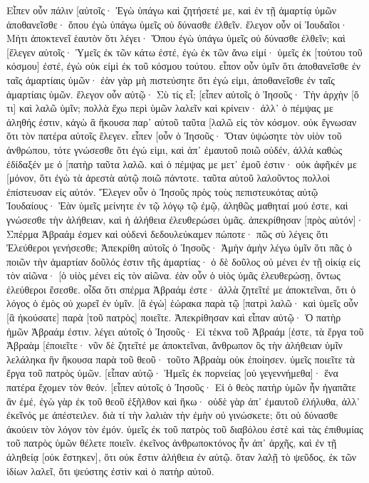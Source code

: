 Εἶπεν οὖν πάλιν [αὐτοῖς· Ἐγὼ ὑπάγω καὶ ζητήσετέ με, καὶ ἐν τῇ ἁμαρτίᾳ ὑμῶν ἀποθανεῖσθε· ὅπου ἐγὼ ὑπάγω ὑμεῖς οὐ δύνασθε ἐλθεῖν. 
ἔλεγον οὖν οἱ Ἰουδαῖοι· Μήτι ἀποκτενεῖ ἑαυτὸν ὅτι λέγει· Ὅπου ἐγὼ ὑπάγω ὑμεῖς οὐ δύνασθε ἐλθεῖν; 
καὶ [ἔλεγεν αὐτοῖς· Ὑμεῖς ἐκ τῶν κάτω ἐστέ, ἐγὼ ἐκ τῶν ἄνω εἰμί· ὑμεῖς ἐκ [τούτου τοῦ κόσμου] ἐστέ, ἐγὼ οὐκ εἰμὶ ἐκ τοῦ κόσμου τούτου. 
εἶπον οὖν ὑμῖν ὅτι ἀποθανεῖσθε ἐν ταῖς ἁμαρτίαις ὑμῶν· ἐὰν γὰρ μὴ πιστεύσητε ὅτι ἐγώ εἰμι, ἀποθανεῖσθε ἐν ταῖς ἁμαρτίαις ὑμῶν. 
ἔλεγον οὖν αὐτῷ· Σὺ τίς εἶ; [εἶπεν αὐτοῖς ὁ Ἰησοῦς· Τὴν ἀρχὴν [ὅ τι] καὶ λαλῶ ὑμῖν; 
πολλὰ ἔχω περὶ ὑμῶν λαλεῖν καὶ κρίνειν· ἀλλ᾽ ὁ πέμψας με ἀληθής ἐστιν, κἀγὼ ἃ ἤκουσα παρ᾽ αὐτοῦ ταῦτα [λαλῶ εἰς τὸν κόσμον. 
οὐκ ἔγνωσαν ὅτι τὸν πατέρα αὐτοῖς ἔλεγεν. 
εἶπεν [οὖν ὁ Ἰησοῦς· Ὅταν ὑψώσητε τὸν υἱὸν τοῦ ἀνθρώπου, τότε γνώσεσθε ὅτι ἐγώ εἰμι, καὶ ἀπ᾽ ἐμαυτοῦ ποιῶ οὐδέν, ἀλλὰ καθὼς ἐδίδαξέν με ὁ [πατὴρ ταῦτα λαλῶ. 
καὶ ὁ πέμψας με μετ᾽ ἐμοῦ ἐστιν· οὐκ ἀφῆκέν με [μόνον, ὅτι ἐγὼ τὰ ἀρεστὰ αὐτῷ ποιῶ πάντοτε. 
ταῦτα αὐτοῦ λαλοῦντος πολλοὶ ἐπίστευσαν εἰς αὐτόν. 
Ἔλεγεν οὖν ὁ Ἰησοῦς πρὸς τοὺς πεπιστευκότας αὐτῷ Ἰουδαίους· Ἐὰν ὑμεῖς μείνητε ἐν τῷ λόγῳ τῷ ἐμῷ, ἀληθῶς μαθηταί μού ἐστε, 
καὶ γνώσεσθε τὴν ἀλήθειαν, καὶ ἡ ἀλήθεια ἐλευθερώσει ὑμᾶς. 
ἀπεκρίθησαν [πρὸς αὐτόν]· Σπέρμα Ἀβραάμ ἐσμεν καὶ οὐδενὶ δεδουλεύκαμεν πώποτε· πῶς σὺ λέγεις ὅτι Ἐλεύθεροι γενήσεσθε; 
Ἀπεκρίθη αὐτοῖς ὁ Ἰησοῦς· Ἀμὴν ἀμὴν λέγω ὑμῖν ὅτι πᾶς ὁ ποιῶν τὴν ἁμαρτίαν δοῦλός ἐστιν τῆς ἁμαρτίας· 
ὁ δὲ δοῦλος οὐ μένει ἐν τῇ οἰκίᾳ εἰς τὸν αἰῶνα· [ὁ υἱὸς μένει εἰς τὸν αἰῶνα. 
ἐὰν οὖν ὁ υἱὸς ὑμᾶς ἐλευθερώσῃ, ὄντως ἐλεύθεροι ἔσεσθε. 
οἶδα ὅτι σπέρμα Ἀβραάμ ἐστε· ἀλλὰ ζητεῖτέ με ἀποκτεῖναι, ὅτι ὁ λόγος ὁ ἐμὸς οὐ χωρεῖ ἐν ὑμῖν. 
[ἃ ἐγὼ] ἑώρακα παρὰ τῷ [πατρὶ λαλῶ· καὶ ὑμεῖς οὖν [ἃ ἠκούσατε] παρὰ [τοῦ πατρὸς] ποιεῖτε. 
Ἀπεκρίθησαν καὶ εἶπαν αὐτῷ· Ὁ πατὴρ ἡμῶν Ἀβραάμ ἐστιν. λέγει αὐτοῖς ὁ Ἰησοῦς· Εἰ τέκνα τοῦ Ἀβραάμ [ἐστε, τὰ ἔργα τοῦ Ἀβραὰμ [ἐποιεῖτε· 
νῦν δὲ ζητεῖτέ με ἀποκτεῖναι, ἄνθρωπον ὃς τὴν ἀλήθειαν ὑμῖν λελάληκα ἣν ἤκουσα παρὰ τοῦ θεοῦ· τοῦτο Ἀβραὰμ οὐκ ἐποίησεν. 
ὑμεῖς ποιεῖτε τὰ ἔργα τοῦ πατρὸς ὑμῶν. [εἶπαν αὐτῷ· Ἡμεῖς ἐκ πορνείας [οὐ γεγεννήμεθα]· ἕνα πατέρα ἔχομεν τὸν θεόν. 
[εἶπεν αὐτοῖς ὁ Ἰησοῦς· Εἰ ὁ θεὸς πατὴρ ὑμῶν ἦν ἠγαπᾶτε ἂν ἐμέ, ἐγὼ γὰρ ἐκ τοῦ θεοῦ ἐξῆλθον καὶ ἥκω· οὐδὲ γὰρ ἀπ᾽ ἐμαυτοῦ ἐλήλυθα, ἀλλ᾽ ἐκεῖνός με ἀπέστειλεν. 
διὰ τί τὴν λαλιὰν τὴν ἐμὴν οὐ γινώσκετε; ὅτι οὐ δύνασθε ἀκούειν τὸν λόγον τὸν ἐμόν. 
ὑμεῖς ἐκ τοῦ πατρὸς τοῦ διαβόλου ἐστὲ καὶ τὰς ἐπιθυμίας τοῦ πατρὸς ὑμῶν θέλετε ποιεῖν. ἐκεῖνος ἀνθρωποκτόνος ἦν ἀπ᾽ ἀρχῆς, καὶ ἐν τῇ ἀληθείᾳ [οὐκ ἔστηκεν], ὅτι οὐκ ἔστιν ἀλήθεια ἐν αὐτῷ. ὅταν λαλῇ τὸ ψεῦδος, ἐκ τῶν ἰδίων λαλεῖ, ὅτι ψεύστης ἐστὶν καὶ ὁ πατὴρ αὐτοῦ. 
